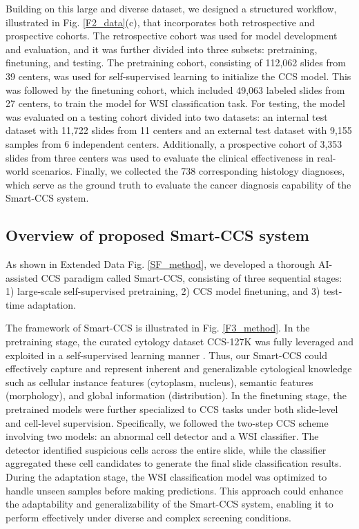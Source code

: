 Building on this large and diverse dataset, we designed a structured workflow, illustrated in Fig. \ref{F2_data}(c), that incorporates both retrospective and prospective cohorts. The retrospective cohort was used for model development and evaluation, and it was further divided into three subsets: pretraining, finetuning, and testing. The pretraining cohort, consisting of 112,062 slides from 39 centers, was used for self-supervised learning to initialize the CCS model. This was followed by the finetuning cohort, which included 49,063 labeled slides from 27 centers, to train the model for WSI classification task. For testing, the model was evaluated on a testing cohort divided into two datasets: an internal test dataset with 11,722 slides from 11 centers and an external test dataset with 9,155 samples from 6 independent centers.  Additionally, a prospective cohort of 3,353 slides from three centers was used to evaluate the clinical effectiveness in real-world scenarios. Finally, we collected the 738 corresponding histology diagnoses, which serve as the ground truth to evaluate the cancer diagnosis capability of the Smart-CCS system.

\subsection*{Overview of proposed Smart-CCS system}\label{subsec2-2}
As shown in Extended Data Fig. \ref{SF_method}, we developed a thorough AI-assisted CCS paradigm called Smart-CCS, consisting of three sequential stages: 1) large-scale self-supervised pretraining, 2) CCS model finetuning, and 3) test-time adaptation.

The framework of Smart-CCS is illustrated in Fig. \ref{F3_method}. In the pretraining stage, the curated cytology dataset CCS-127K was fully leveraged and exploited in a self-supervised learning manner \cite{oquabdinov2}. Thus, our Smart-CCS could effectively capture and represent inherent and generalizable cytological knowledge such as cellular instance features (cytoplasm, nucleus), semantic features (morphology), and global information (distribution).
In the finetuning stage, the pretrained models were further specialized to CCS tasks under both slide-level and cell-level supervision. Specifically, we followed the two-step CCS scheme involving two models: an abnormal cell detector and a WSI classifier. The detector identified suspicious cells across the entire slide, while the classifier aggregated these cell candidates to generate the final slide classification results. During the adaptation stage, the WSI classification model was optimized to handle unseen samples before making predictions. This approach could enhance the adaptability and generalizability of the Smart-CCS system, enabling it to perform effectively under diverse and complex screening conditions.

